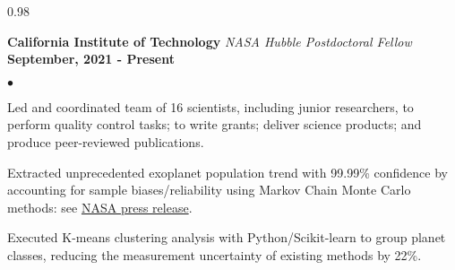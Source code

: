\documentclass[margin,line, 12pt]{res}
\newenvironment{list2}{
  \begin{list}{$\bullet$}{%
      \setlength{\itemsep}{0.04in}
      \setlength{\parsep}{0.00in} \setlength{\parskip}{0in}
      \setlength{\topsep}{0.0in} \setlength{\partopsep}{0in}
      \setlength{\leftmargin}{0.2in}}}{\end{list}}
\begin{document}
\begin{spacing}{0.98}
\begin{resume}

\textbf{California Institute of Technology} \hfill \newline
\textit{NASA Hubble Postdoctoral Fellow} \hfill \textbf{September, 2021 - Present}\newline
    \begin{list2}
    	\vspace*{-5mm}
	
	\item Led and coordinated team of 16 scientists, including junior researchers, to perform quality control tasks; to write grants; deliver science products; and produce peer-reviewed publications.
	
    	\item Extracted unprecedented exoplanet population trend with 99.99\% confidence by accounting for sample biases/reliability using Markov Chain Monte Carlo methods: see \href{https://exoplanets.nasa.gov/news/1768/discovery-alert-on-our-galaxys-outskirts-a-poverty-of-planets/}{NASA press release}.
	
	
	\item Executed K-means clustering analysis with Python/Scikit-learn to group planet classes, reducing the measurement uncertainty of existing methods by 22\%. 
	

\end{list2}
\end{resume}
\end{spacing}
\end{document}
